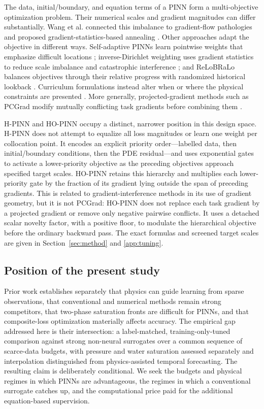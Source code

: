 The data, initial/boundary, and equation terms of a PINN form a multi-objective optimization problem. Their numerical scales and gradient magnitudes can differ substantially. Wang et al. connected this imbalance to gradient-flow pathologies and proposed gradient-statistics-based annealing \cite{Wang2022}. Other approaches adapt the objective in different ways. Self-adaptive PINNs learn pointwise weights that emphasize difficult locations \cite{McClenny2023}; inverse-Dirichlet weighting uses gradient statistics to reduce scale imbalance and catastrophic interference \cite{Maddu2022}; and ReLoBRaLo balances objectives through their relative progress with randomized historical lookback \cite{Bischof2025}. Curriculum formulations instead alter when or where the physical constraints are presented \cite{Krishnapriyan2021}. More generally, projected-gradient methods such as PCGrad modify mutually conflicting task gradients before combining them \cite{Yu2020}.

H-PINN and HO-PINN occupy a distinct, narrower position in this design space. H-PINN does not attempt to equalize all loss magnitudes or learn one weight per collocation point. It encodes an explicit priority order---labelled data, then initial/boundary conditions, then the PDE residual---and uses exponential gates to activate a lower-priority objective as the preceding objectives approach specified target scales. HO-PINN retains this hierarchy and multiplies each lower-priority gate by the fraction of its gradient lying outside the span of preceding gradients. This is related to gradient-interference methods in its use of gradient geometry, but it is not PCGrad: HO-PINN does not replace each task gradient by a projected gradient or remove only negative pairwise conflicts. It uses a detached scalar novelty factor, with a positive floor, to modulate the hierarchical objective before the ordinary backward pass. The exact formulas and screened target scales are given in Section~\ref{sec:method} and \ref{app:tuning}.

\subsection{Position of the present study}

Prior work establishes separately that physics can guide learning from sparse observations, that conventional and numerical methods remain strong competitors, that two-phase saturation fronts are difficult for PINNs, and that composite-loss optimization materially affects accuracy. The empirical gap addressed here is their intersection: a label-matched, training-only-tuned comparison against strong non-neural surrogates over a common sequence of scarce-data budgets, with pressure and water saturation assessed separately and interpolation distinguished from physics-assisted temporal forecasting. The resulting claim is deliberately conditional. We seek the budgets and physical regimes in which PINNs are advantageous, the regimes in which a conventional surrogate catches up, and the computational price paid for the additional equation-based supervision.
